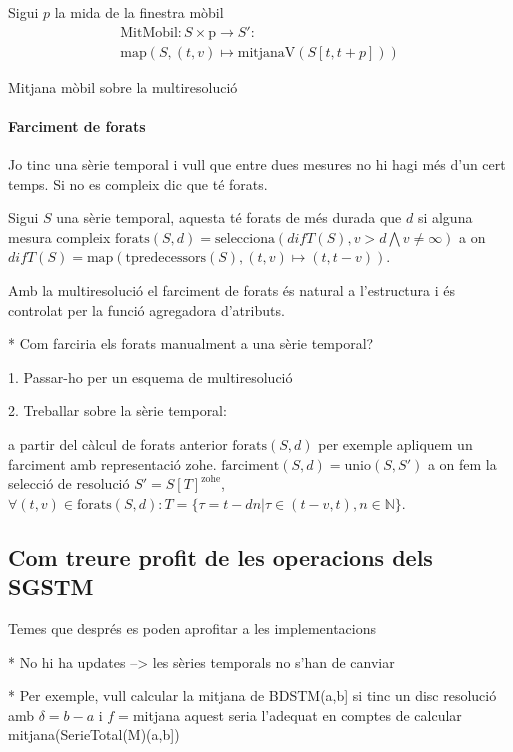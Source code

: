 Sigui $p$ la mida de la finestra mòbil
\begin{gather*}
  \text{MitMobil}: S \times \text{p} \longrightarrow S':\\
  \text{map}(S,(t,v)\mapsto \text{mitjanaV}(S[t,t+p]))
\end{gather*}


Mitjana mòbil sobre la multiresolució



\paragraph{Farciment de forats}

Jo tinc una sèrie temporal i vull que entre dues mesures no hi hagi més d'un cert temps. Si no es compleix dic que té forats. 

Sigui $S$ una sèrie temporal, aquesta té forats de més durada que $d$
si alguna mesura compleix $\text{forats}(S,d) = \text{selecciona}(difT(S),v>d \bigwedge v\neq\infty)$ a on $difT(S) = \text{map}(\text{tpredecessors}(S),(t,v)\mapsto(t,t-v))$.

Amb la multiresolució el farciment de forats és natural a l'estructura i és controlat per la funció agregadora d'atributs.


* Com farciria els forats manualment a una sèrie temporal?

1. Passar-ho per un esquema de multiresolució

2. Treballar sobre la sèrie temporal:

a partir del càlcul de forats anterior $\text{forats}(S,d)$ per
exemple apliquem un farciment amb representació
zohe. $\text{farciment}(S,d) = \text{unio}(S,S')$ a on fem la selecció
de resolució $S' = S[T]^{\text{zohe}}$, $\forall (t,v) \in
\text{forats}(S,d): T = \{ \tau = t - dn |
\tau\in(t-v,t),n\in\mathbb{N} \}$.







\subsection{Com treure profit de les operacions dels SGSTM}

Temes que després es poden aprofitar a les implementacions

* No hi ha updates --> les sèries temporals no s'han de canviar

* Per exemple, vull calcular la mitjana de  BDSTM(a,b] si tinc un disc resolució amb $\delta=b-a$ i $f=$mitjana aquest seria l'adequat en comptes de calcular mitjana(SerieTotal(M)(a,b])

